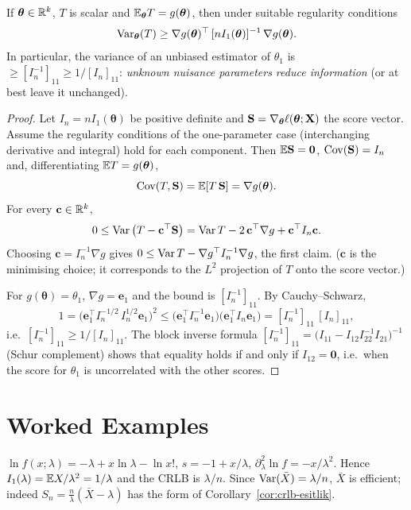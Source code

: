 \documentclass[main.tex]{subfiles}
\begin{document}
\begin{theorem}\label{thm:crlb-cok}
If $\bm\theta\in\mathbb{R}^k$, $T$ is scalar and $\mathbb{E}_{\bm\theta}T=g(\bm\theta)$, then under suitable regularity conditions
\[
\operatorname{Var}_{\bm\theta}(T)\ge\nabla g(\bm\theta)^\top\,[nI_1(\bm\theta)]^{-1}\,\nabla g(\bm\theta).
\]
In particular, the variance of an unbiased estimator of $\theta_1$ is $\ge[I_n^{-1}]_{11}\ge1/[I_n]_{11}$: \emph{unknown nuisance parameters reduce information} (or at best leave it unchanged).
\end{theorem}
\begin{proof}
Let $I_n=nI_1(\bm\theta)$ be positive definite and $\mathbf S=\nabla_{\bm\theta}\ell(\bm\theta;\mathbf{X})$ the score vector. Assume the regularity conditions of the one-parameter case (interchanging derivative and integral) hold for each component. Then $\mathbb{E}\mathbf S=\mathbf 0$, $\operatorname{Cov}(\mathbf S)=I_n$ and, differentiating $\mathbb{E} T=g(\bm\theta)$,
\[
\operatorname{Cov}(T,\mathbf S)=\mathbb{E}[T\,\mathbf S]=\nabla g(\bm\theta).
\]
For every $\mathbf c\in\mathbb{R}^k$,
\[
0\le\operatorname{Var}\big(T-\mathbf c^\top\mathbf S\big)=\operatorname{Var} T-2\,\mathbf c^\top\nabla g+\mathbf c^\top I_n\mathbf c .
\]
Choosing $\mathbf c=I_n^{-1}\nabla g$ gives $0\le\operatorname{Var} T-\nabla g^\top I_n^{-1}\nabla g$, the first claim. ($\mathbf c$ is the minimising choice; it corresponds to the $L^2$ projection of $T$ onto the score vector.)

For $g(\bm\theta)=\theta_1$, $\nabla g=\mathbf e_1$ and the bound is $[I_n^{-1}]_{11}$. By Cauchy--Schwarz,
\[
1=\big(\mathbf e_1^\top I_n^{-1/2}\,I_n^{1/2}\mathbf e_1\big)^2\le\big(\mathbf e_1^\top I_n^{-1}\mathbf e_1\big)\big(\mathbf e_1^\top I_n\mathbf e_1\big)=[I_n^{-1}]_{11}\,[I_n]_{11},
\]
i.e.\ $[I_n^{-1}]_{11}\ge1/[I_n]_{11}$. The block inverse formula $[I_n^{-1}]_{11}=\big(I_{11}-I_{12}I_{22}^{-1}I_{21}\big)^{-1}$ (Schur complement) shows that equality holds if and only if $I_{12}=\mathbf 0$, i.e.\ when the score for $\theta_1$ is uncorrelated with the other scores.
\end{proof}

\section{Worked Examples}

\begin{example}[Poisson]\label{ex:poisson-fisher}
$\ln f(x;\lambda)=-\lambda+x\ln\lambda-\ln x!$, $s=-1+x/\lambda$, $\partial^2_\lambda\ln f=-x/\lambda^2$. Hence $I_1(\lambda)=\mathbb{E} X/\lambda^2=1/\lambda$ and the CRLB is $\lambda/n$. Since $\operatorname{Var}(\bar X)=\lambda/n$, $\bar X$ is efficient; indeed $S_n=\frac{n}{\lambda}(\bar X-\lambda)$ has the form of Corollary~\ref{cor:crlb-esitlik}.
\end{example}
\end{document}

